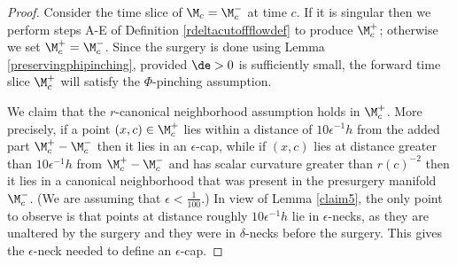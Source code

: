 \begin{proof}
Consider the time slice of $\M_c = \M_c^-$ at time $c$.
If it is
singular then we perform steps A-E of Definition \ref{rdeltacutoffflowdef}
to produce $\M_c^+$; otherwise we set $\M_c^+=\M_c^-$.
Since the surgery is done using Lemma \ref{preservingphipinching},
provided $\de>0$ is sufficiently small,
the forward time slice $\M_c^+$ will satisfy the $\Phi$-pinching
assumption.

We claim that the $r$-canonical neighborhood
assumption holds in $\M_c^+$.
More precisely, if a point
$(x,c) \in \M_c^+$ lies within a distance of $10 \epsilon^{-1} h$ from
the added part $\M_c^+ - \M_c^-$ then it lies in an
$\epsilon$-cap, while if $(x,c)$ lies at distance greater than
$10 \epsilon^{-1} h$ from $\M_c^+ - \M_c^-$ and has
scalar curvature greater than $r(c)^{-2}$ then it lies in a
canonical neighborhood that was present in the presurgery manifold
$\M_c^-$.
(We are assuming that $\epsilon < \frac{1}{100}$.)
In view of  Lemma \ref{claim5},
the only point to observe is that points at distance roughly
$10 \epsilon^{-1} h$ lie in $\epsilon$-necks, as they are unaltered
by the surgery and they were in $\delta$-necks before the surgery.
This gives the $\epsilon$-neck needed to define an
$\epsilon$-cap.


\end{proof}
